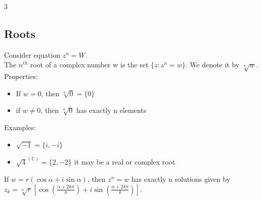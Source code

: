 \documentclass{article}
\begin{document}
3
\subsection{Roots}
Consider equation $z^n = W$. \\
The $n^{th}$ root of a complex number w is the set $\{z: z^n=w\}$. We denote it by $\sqrt[n]{w}$.
Properties: 
\begin{itemize}
	\item If $w=0$, then $\sqrt[n]{0} = \{0\}$
	\item if $w\neq 0$, then $\sqrt[n]{0}$ has exactly n elements
\end{itemize}
Examples: 
\begin{itemize}
	\item $\sqrt{-1} = \{i, -i\}$
	\item $\sqrt{4}^{(\mathbb{C})} = \{2, -2\}$ it may be a real or complex root
\end{itemize}
If $w = r(\cos\alpha + i\sin\alpha)$, then $z^n=w$ has exactly  n solutions given by 
$z_k = \sqrt[n]{r}[\cos(\frac{\alpha + 2k\pi}{n}) + i\sin(\frac{\alpha + 2k\pi}{k})]$.
\end{document}
